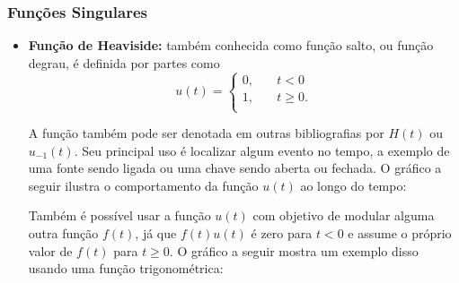 \documentclass{article}
\numberwithin{equation}{section}
\begin{document}
\subsubsection{Funções Singulares}

\begin{itemize}
    \item \textbf{Função de Heaviside:} também conhecida como função salto, ou função degrau, é definida por partes como
    $$ u(t) =
    \begin{cases}
        0, &\quad t<0 \\
        1, &\quad t\geqslant 0. \\
    \end{cases}
    $$

    A função também pode ser denotada em outras bibliografias por $H(t)$ ou $u_{-1}(t)$. Seu principal uso é localizar algum evento no tempo, a exemplo de uma fonte sendo ligada ou uma chave sendo aberta ou fechada. O gráfico a seguir ilustra o comportamento da função $u(t)$ ao longo do tempo:

    \begin{center}
    \end{center}

    Também é possível usar a função $u(t)$ com objetivo de modular alguma outra função $f(t)$, já que $f(t)u(t)$ é zero para $t<0$ e assume o próprio valor de $f(t)$ para $t \geqslant 0$. O gráfico a seguir mostra um exemplo disso usando uma função trigonométrica:


\end{itemize}
\end{document}

